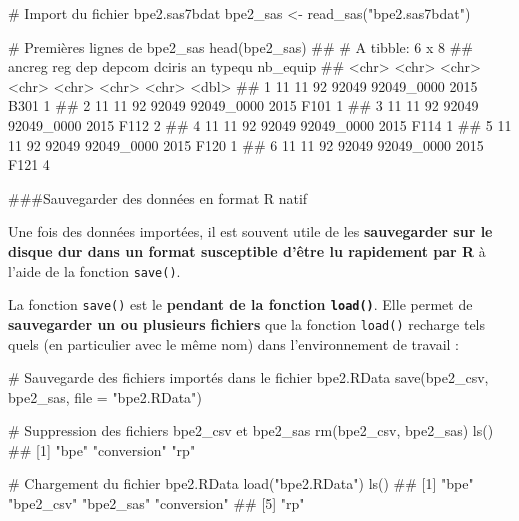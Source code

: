 \documentclass[12pt,twosided, notitlepage]{book}
\newenvironment{Shaded}{}{}
\newcommand{\CommentTok}[1]{\textcolor[rgb]{0.00,0.50,0.00}{#1}}
\newcommand{\DataTypeTok}[1]{#1}
\newcommand{\KeywordTok}[1]{\textcolor[rgb]{0.00,0.00,1.00}{#1}}
\newcommand{\NormalTok}[1]{#1}
\newcommand{\StringTok}[1]{\textcolor[rgb]{0.00,0.50,0.50}{#1}}
\renewenvironment{Shaded}{\begin{snugshade}}{\end{snugshade}}
\begin{document}
\begin{Shaded}
\begin{Highlighting}[]
\CommentTok{# Import du fichier bpe2.sas7bdat}
\NormalTok{bpe2_sas <-}\StringTok{ }\KeywordTok{read_sas}\NormalTok{(}\StringTok{"bpe2.sas7bdat"}\NormalTok{)}

\CommentTok{# Premières lignes de bpe2_sas}
\KeywordTok{head}\NormalTok{(bpe2_sas)}
\NormalTok{  ## # A tibble: 6 x 8}
\NormalTok{  ##   ancreg   reg   dep depcom     dciris    an typequ nb_equip}
\NormalTok{  ##    <chr> <chr> <chr>  <chr>      <chr> <chr>  <chr>    <dbl>}
\NormalTok{  ## 1     11    11    92  92049 92049_0000  2015   B301        1}
\NormalTok{  ## 2     11    11    92  92049 92049_0000  2015   F101        1}
\NormalTok{  ## 3     11    11    92  92049 92049_0000  2015   F112        2}
\NormalTok{  ## 4     11    11    92  92049 92049_0000  2015   F114        1}
\NormalTok{  ## 5     11    11    92  92049 92049_0000  2015   F120        1}
\NormalTok{  ## 6     11    11    92  92049 92049_0000  2015   F121        4}
\end{Highlighting}
\end{Shaded}

\#\#\#Sauvegarder des données en format R natif

Une fois des données importées, il est souvent utile de les
\textbf{sauvegarder sur le disque dur dans un format susceptible d'être
lu rapidement par R} à l'aide de la fonction
\texttt{save()}.

La fonction \texttt{save()} est le \textbf{pendant de la fonction
\texttt{load()}}. Elle permet de \textbf{sauvegarder un ou plusieurs
fichiers} que la fonction \texttt{load()} recharge
tels quels (en particulier avec le même nom) dans l'environnement de
travail :

\begin{Shaded}
\begin{Highlighting}[]
\CommentTok{# Sauvegarde des fichiers importés dans le fichier bpe2.RData}
\KeywordTok{save}\NormalTok{(bpe2_csv, bpe2_sas, }\DataTypeTok{file =} \StringTok{"bpe2.RData"}\NormalTok{)}

\CommentTok{# Suppression des fichiers bpe2_csv et bpe2_sas}
\KeywordTok{rm}\NormalTok{(bpe2_csv, bpe2_sas)}
\KeywordTok{ls}\NormalTok{()}
\NormalTok{  ## [1] "bpe"        "conversion" "rp"}

\CommentTok{# Chargement du fichier bpe2.RData}
\KeywordTok{load}\NormalTok{(}\StringTok{"bpe2.RData"}\NormalTok{)}
\KeywordTok{ls}\NormalTok{()}
\NormalTok{  ## [1] "bpe"        "bpe2_csv"   "bpe2_sas"   "conversion"}
\NormalTok{  ## [5] "rp"}
\end{Highlighting}
\end{Shaded}
\end{document}
